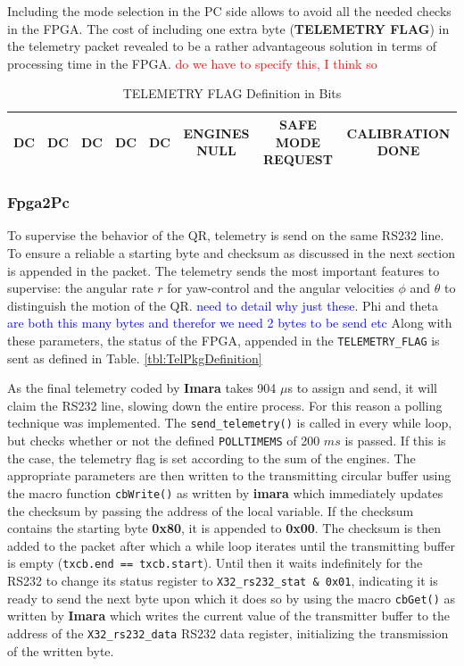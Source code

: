 \documentclass{article}
\newcommand\worries[1]{\textcolor{red}{#1}} %
\newcommand\todo[1]{\textcolor{blue}{#1}} %
\begin{document}
Including the mode selection in the PC side allows to avoid all the needed checks in the FPGA. The cost of including one extra byte (\textbf{TELEMETRY FLAG}) in the telemetry packet revealed to be a rather advantageous solution in terms of processing time in the FPGA. \worries{do we have to specify this, I think so}

\begin{table}[h]
\centering
\begin{tabular}{|c|c|c|c|c|c|c|c|}
\hline 
DC & DC & DC & DC & DC & ENGINES NULL & SAFE MODE REQUEST & CALIBRATION DONE \\
\hline 
\end{tabular} 
\caption{TELEMETRY FLAG Definition in Bits}
\label{tbl:TelFlagDef}
\end{table}


\subsubsection{Fpga2Pc}
To supervise the behavior of the QR, telemetry is send on the same RS232 line. To ensure a reliable a starting byte and checksum as discussed in the next section is appended in the packet. The telemetry sends the most important features to supervise: the angular rate $r$ for yaw-control and the angular velocities $\phi$ and $\theta$ to distinguish the motion of the QR.  \todo{need to detail why just these}. Phi and theta \todo{are both this many bytes and therefor we need 2 bytes to be send etc} Along with these parameters, the status of the FPGA, appended in the \texttt{TELEMETRY\_FLAG} is sent as defined in Table. \ref{tbl:TelPkgDefinition} 

As the final telemetry coded by \textbf{Imara} takes 904 $\mu$s to assign and send, it will claim the RS232 line, slowing down the entire process. For this reason a polling technique was implemented. The \texttt{send\_telemetry()} is called in every while loop, but checks whether or not the defined \texttt{POLLTIMEMS} of 200 $ms$ is passed. If this is the case, the telemetry flag is set according to the sum of the engines. The appropriate parameters are then written to the transmitting circular buffer using the macro function \texttt{cbWrite()} as written by \textbf{imara} which immediately updates the checksum by passing the address of the local variable. If the checksum contains the starting byte \textbf{0x80}, it is appended to \textbf{0x00}. The checksum is then added to the packet after which a while loop iterates until the transmitting buffer is empty (\texttt{txcb.end == txcb.start}). Until then it waits indefinitely for the RS232 to change its status register to \texttt{X32\_rs232\_stat \& 0x01}, indicating it is ready to send the next byte upon which it does so by using the macro \texttt{cbGet()} as written by \textbf{Imara} which writes the current value of the transmitter buffer to the address of the \texttt{X32\_rs232\_data} RS232 data register, initializing the transmission of the written byte. 
\end{document}
